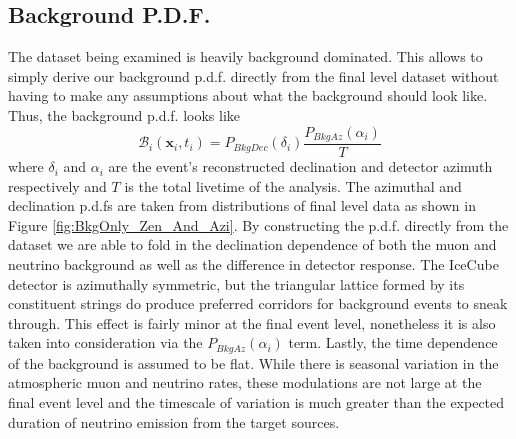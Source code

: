 \documentclass{gatech-thesis}
\begin{document}
\subsection{Background P.D.F.}
The dataset being examined is heavily background dominated. This allows to simply derive our background p.d.f. directly from the final level dataset without having to make any assumptions about what the background should look like. Thus, the background p.d.f. looks like 
\begin{equation}
\mathcal{B}_i(\mathbf{x}_i,t_i) = P_{BkgDec}(\delta_i)\frac{P_{BkgAz}(\alpha_i)}{T}
\end{equation}
where $\delta_i$ and $\alpha_i$ are the event's reconstructed declination and detector azimuth respectively and $T$ is the total livetime of the analysis. The azimuthal and declination p.d.fs are taken from distributions of final level data as shown in Figure \ref{fig:BkgOnly_Zen_And_Azi}. By constructing the p.d.f. directly from the dataset we are able to fold in the declination dependence of both the muon and neutrino background as well as the difference in detector response. The IceCube detector is azimuthally symmetric, but the triangular lattice formed by its constituent strings do produce preferred corridors for background events to sneak through. This effect is fairly minor at the final event level, nonetheless it is also taken into consideration via the $P_{BkgAz}(\alpha_i)$ term. Lastly, the time dependence of the background is assumed to be flat. While there is seasonal variation in the atmospheric muon and neutrino rates, these modulations are not large at the final event level and the timescale of variation is much greater than the expected duration of neutrino emission from the target sources.
\end{document}
